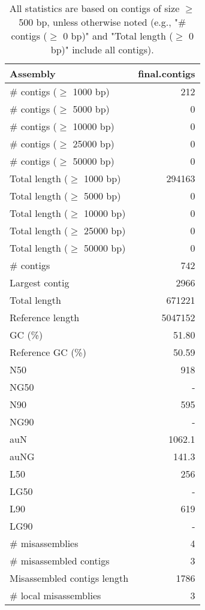 \documentclass[12pt,a4paper]{article}
\begin{document}
\begin{table}[ht]
\begin{center}
\caption{All statistics are based on contigs of size $\geq$ 500 bp, unless otherwise noted (e.g., "\# contigs ($\geq$ 0 bp)" and "Total length ($\geq$ 0 bp)" include all contigs).}
\begin{tabular}{|l*{1}{|r}|}
\hline
Assembly & final.contigs \\ \hline
\# contigs ($\geq$ 1000 bp) & 212 \\ \hline
\# contigs ($\geq$ 5000 bp) & 0 \\ \hline
\# contigs ($\geq$ 10000 bp) & 0 \\ \hline
\# contigs ($\geq$ 25000 bp) & 0 \\ \hline
\# contigs ($\geq$ 50000 bp) & 0 \\ \hline
Total length ($\geq$ 1000 bp) & 294163 \\ \hline
Total length ($\geq$ 5000 bp) & 0 \\ \hline
Total length ($\geq$ 10000 bp) & 0 \\ \hline
Total length ($\geq$ 25000 bp) & 0 \\ \hline
Total length ($\geq$ 50000 bp) & 0 \\ \hline
\# contigs & 742 \\ \hline
Largest contig & 2966 \\ \hline
Total length & 671221 \\ \hline
Reference length & 5047152 \\ \hline
GC (\%) & 51.80 \\ \hline
Reference GC (\%) & 50.59 \\ \hline
N50 & 918 \\ \hline
NG50 & - \\ \hline
N90 & 595 \\ \hline
NG90 & - \\ \hline
auN & 1062.1 \\ \hline
auNG & 141.3 \\ \hline
L50 & 256 \\ \hline
LG50 & - \\ \hline
L90 & 619 \\ \hline
LG90 & - \\ \hline
\# misassemblies & 4 \\ \hline
\# misassembled contigs & 3 \\ \hline
Misassembled contigs length & 1786 \\ \hline
\# local misassemblies & 3 \\ \hline

\end{tabular}
\end{center}
\end{table}
\end{document}
